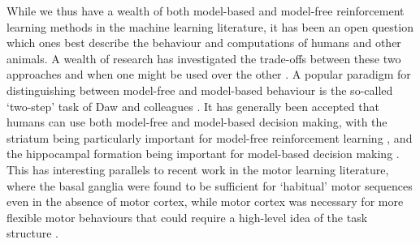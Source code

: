 While we thus have a wealth of both model-based and model-free reinforcement learning methods in the machine learning literature, it has been an open question which ones best describe the behaviour and computations of humans and other animals.
A wealth of research has investigated the trade-offs between these two approaches and when one might be used over the other \citep{daw2005uncertainty, geerts2020general}.
A popular paradigm for distinguishing between model-free and model-based behaviour is the so-called `two-step' task of Daw and colleagues \citep{daw2011model}.
It has generally been accepted that humans can use both model-free and model-based decision making, with the striatum being particularly important for model-free reinforcement learning \citep{yin2004lesions, yin2005role}, and the hippocampal formation being important for model-based decision making \citep{vikbladh2019hippocampal,geerts2020general,miller2017dorsal}.
This has interesting parallels to recent work in the motor learning literature, where the basal ganglia were found to be sufficient for `habitual' motor sequences even in the absence of motor cortex, while motor cortex was necessary for more flexible motor behaviours that could require a high-level idea of the task structure \citep{mizes2023motor}.


